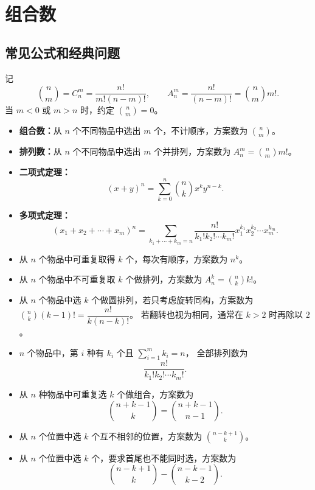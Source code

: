 
\section{组合数}

\subsection{常见公式和经典问题}

记
\[
    \binom{n}{m}=C_n^m=\frac{n!}{m!(n-m)!},\qquad
    A_n^m=\frac{n!}{(n-m)!}=\binom{n}{m}m!.
\]
当 $m<0$ 或 $m>n$ 时，约定 $\binom{n}{m}=0$。

\begin{itemize}
    \item \textbf{组合数：}从 $n$ 个不同物品中选出 $m$ 个，不计顺序，方案数为
    $\binom{n}{m}$。
    \item \textbf{排列数：}从 $n$ 个不同物品中选出 $m$ 个并排列，方案数为
    $A_n^m=\binom{n}{m}m!$。
    \item \textbf{二项式定理：}
    \[
        (x+y)^n=\sum_{k=0}^{n}\binom{n}{k}x^ky^{n-k}.
    \]
    \item \textbf{多项式定理：}
    \[
        (x_1+x_2+\cdots+x_m)^n
        =\sum_{k_1+\cdots+k_m=n}
        \frac{n!}{k_1!k_2!\cdots k_m!}
        x_1^{k_1}x_2^{k_2}\cdots x_m^{k_m}.
    \]
    \item 从 $n$ 个物品中可重复取得 $k$ 个，每次有顺序，方案数为 $n^k$。
    \item 从 $n$ 个物品中不可重复取 $k$ 个做排列，方案数为
    $A_n^k=\binom{n}{k}k!$。
    \item 从 $n$ 个物品中选 $k$ 个做圆排列，若只考虑旋转同构，方案数为
    $\binom{n}{k}(k-1)!=\dfrac{n!}{k(n-k)!}$。
    若翻转也视为相同，通常在 $k>2$ 时再除以 $2$。
    \item $n$ 个物品中，第 $i$ 种有 $k_i$ 个且 $\sum_{i=1}^m k_i=n$，
    全部排列数为
    \[
        \frac{n!}{k_1!k_2!\cdots k_m!}.
    \]
    \item 从 $n$ 种物品中可重复选 $k$ 个做组合，方案数为
    \[
        \binom{n+k-1}{k}=\binom{n+k-1}{n-1}.
    \]
    \item 从 $n$ 个位置中选 $k$ 个互不相邻的位置，方案数为
    $\binom{n-k+1}{k}$。
    \item 从 $n$ 个位置中选 $k$ 个，要求首尾也不能同时选，方案数为
    \[\binom{n-k+1}{k}-\binom{n-k-1}{k-2}.\]
\end{itemize}

